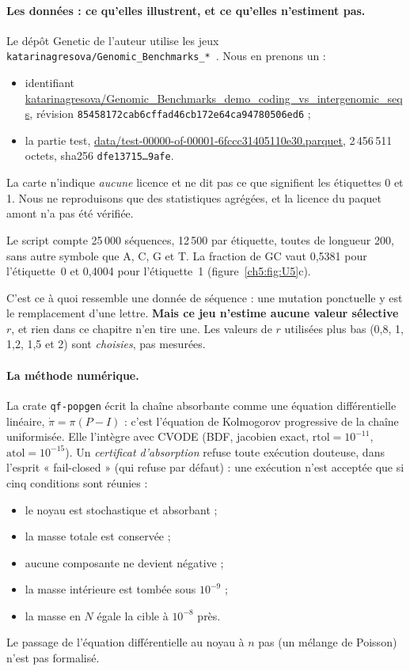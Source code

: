 \paragraph{Les données : ce qu'elles illustrent, et ce qu'elles n'estiment pas.} Le dépôt Genetic de l'auteur
utilise les jeux \texttt{katarinagresova/Genomic\_Benchmarks\_*}~\cite{ch5:gb}. Nous en prenons un :
\begin{itemize}
\item identifiant \url{katarinagresova/Genomic_Benchmarks_demo_coding_vs_intergenomic_seqs}, révision
\texttt{85458172cab6cffad46cb172e64ca94780506ed6} ;
\item la partie test, \url{data/test-00000-of-00001-6fccc31405110e30.parquet}, 2\,456\,511 octets, sha256
\texttt{dfe13715\dots 9afe}.
\end{itemize}
La carte n'indique \emph{aucune} licence et ne dit pas ce que signifient les étiquettes 0 et 1. Nous ne
reproduisons que des statistiques agrégées, et la licence du paquet amont n'a pas été vérifiée.

Le script compte 25\,000 séquences, 12\,500 par étiquette, toutes de longueur 200, sans autre symbole que A, C, G et T.
La fraction de GC vaut 0,5381 pour l'étiquette~0 et 0,4004 pour l'étiquette~1 (figure~\ref{ch5:fig:U5}c).

C'est ce à quoi ressemble une donnée de séquence : une mutation ponctuelle y est le remplacement d'une lettre.
\textbf{Mais ce jeu n'estime aucune valeur sélective $r$}, et rien dans ce chapitre n'en tire une. Les valeurs de $r$
utilisées plus bas (0,8, 1, 1,2, 1,5 et 2) sont \emph{choisies}, pas mesurées.

\paragraph{La méthode numérique.} La crate \texttt{qf-popgen} écrit la chaîne absorbante comme une équation
différentielle linéaire, $\dot\pi=\pi(P-I)$ : c'est l'équation de Kolmogorov progressive de la chaîne uniformisée. Elle
l'intègre avec CVODE (BDF, jacobien exact, $\mathrm{rtol}=10^{-11}$, $\mathrm{atol}=10^{-15}$). Un
\emph{certificat d'absorption} refuse toute exécution douteuse, dans l'esprit « fail-closed » (qui refuse par défaut) : une exécution n'est
acceptée que si cinq conditions sont réunies :
\begin{itemize}
\item le noyau est stochastique et absorbant ;
\item la masse totale est conservée ;
\item aucune composante ne devient négative ;
\item la masse intérieure est tombée sous $10^{-9}$ ;
\item la masse en $N$ égale la cible à $10^{-8}$ près.
\end{itemize}
Le passage de l'équation différentielle au noyau à $n$ pas (un mélange de Poisson) n'est pas formalisé.

